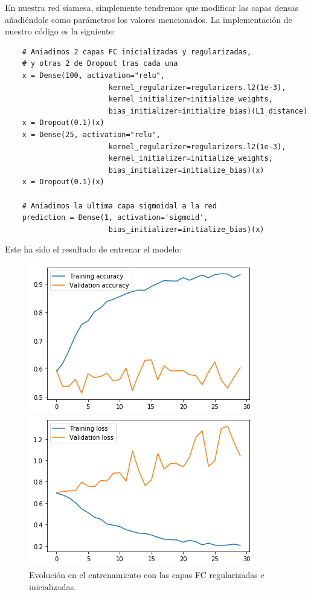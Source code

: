 \documentclass[11pt,a4paper]{article}
\begin{document}
En nuestra red siamesa, simplemente tendremos que modificar las capas densas añadiéndole como parámetros los valores
mencionados. La implementación de nuestro código es la siguiente:

\begin{lstlisting}
    # Aniadimos 2 capas FC inicializadas y regularizadas,
    # y otras 2 de Dropout tras cada una
    x = Dense(100, activation="relu", 
                        kernel_regularizer=regularizers.l2(1e-3),
                        kernel_initializer=initialize_weights,
                        bias_initializer=initialize_bias)(L1_distance)
    x = Dropout(0.1)(x)
    x = Dense(25, activation="relu",
                        kernel_regularizer=regularizers.l2(1e-3),
                        kernel_initializer=initialize_weights,
                        bias_initializer=initialize_bias)(x)
    x = Dropout(0.1)(x)

    # Aniadimos la ultima capa sigmoidal a la red
    prediction = Dense(1, activation='sigmoid',
                        bias_initializer=initialize_bias)(x)
\end{lstlisting}

Este ha sido el resultado de entrenar el modelo:

\begin{figure}[H]
\centering
\begin{minipage}{0.5\textwidth}
  \centering
  \includegraphics[scale=0.5]{img/accuracy-regularizers.png}
\end{minipage}%
\begin{minipage}{0.5\textwidth}
  \centering
  \includegraphics[scale=0.5]{img/loss-regularizers.png}
\end{minipage}
\caption{Evolución en el entrenamiento con las capas FC regularizadas e inicializadas.}
\label{fig:graph-regularizers}
\end{figure}
\end{document}
